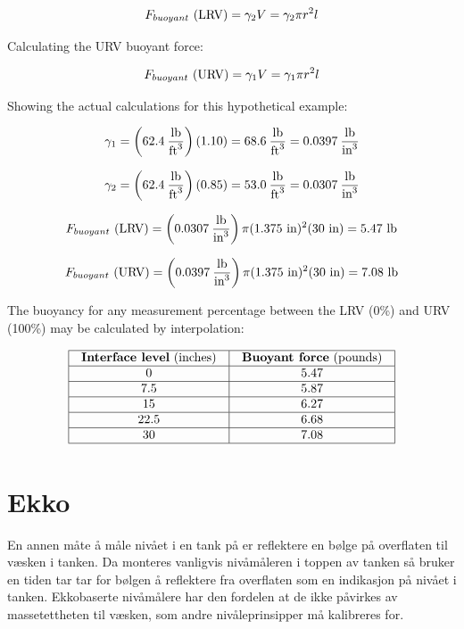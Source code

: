 $$F_{buoyant} \hbox{ (LRV)} = \gamma_2 V = \gamma_2 \pi r^2 l$$


Calculating the URV buoyant force:

$$F_{buoyant} \hbox{ (URV)} = \gamma_1 V = \gamma_1 \pi r^2 l$$


Showing the actual calculations for this hypothetical example:

$$\gamma_1 = \left(62.4 \> {\hbox{lb} \over \hbox{ft}^3}\right) (1.10) = 68.6 \> {\hbox{lb} \over \hbox{ft}^3} = 0.0397 \> {\hbox{lb} \over \hbox{in}^3}$$

$$\gamma_2 = \left(62.4 \> {\hbox{lb} \over \hbox{ft}^3}\right) (0.85) = 53.0 \> {\hbox{lb} \over \hbox{ft}^3} = 0.0307 \> {\hbox{lb} \over \hbox{in}^3}$$

$$F_{buoyant} \hbox{ (LRV)} = \left(0.0307 \> {\hbox{lb} \over \hbox{in}^3}\right) \pi (1.375 \hbox{ in})^2 (30 \hbox{ in}) = 5.47 \hbox{ lb}$$

$$F_{buoyant} \hbox{ (URV)} = \left(0.0397 \> {\hbox{lb} \over \hbox{in}^3}\right) \pi (1.375 \hbox{ in})^2 (30 \hbox{ in}) = 7.08 \hbox{ lb}$$

\filbreak

The buoyancy for any measurement percentage between the LRV (0\%) and URV (100\%) may be calculated by interpolation:


$$\vbox{\offinterlineskip
\halign{\strut
\vrule \quad\hfil # \ \hfil & 
\vrule \quad\hfil # \ \hfil \vrule \cr
\noalign{\hrule}
%
\textbf{Interface level} (inches) & \textbf{Buoyant force} (pounds) \cr
%
\noalign{\hrule}
%
0 & 5.47 \cr
%
\noalign{\hrule}
%
7.5 & 5.87 \cr
%
\noalign{\hrule}
%
15 & 6.27 \cr
%
\noalign{\hrule}
%
22.5 & 6.68 \cr
%
\noalign{\hrule}
%
30 & 7.08 \cr
%
\noalign{\hrule}
} %
}$$ %




\filbreak
\section{Ekko}

En annen måte å måle nivået i en tank på er reflektere en bølge på overflaten til væsken i tanken. Da monteres vanligvis nivåmåleren i toppen av tanken så bruker en tiden tar tar for  bølgen å reflektere fra overflaten som en indikasjon på nivået i tanken. Ekkobaserte nivåmålere har den fordelen at de ikke påvirkes av massetettheten til væsken, som andre nivåleprinsipper må kalibreres for. 

